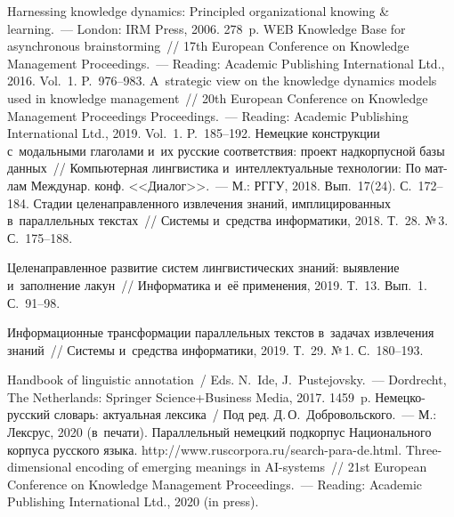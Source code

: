 {\begin{multicols}{2}
{{\begin{thebibliography}{99}
 Harnessing knowledge dynamics: Principled organizational knowing \& 
learning.~--- London: IRM Press, 2006. 278~p.
 WEB Knowledge Base for 
asynchronous brainstorming~// 17th European Conference on Knowledge Management 
Proceedings.~--- Reading: Academic Publishing International Ltd., 2016. Vol.~1. P.~976--983.
 A~strategic view on the knowledge dynamics models used in knowledge 
management~// 20th European Conference on Knowledge Management Proceedings  
Proceedings.~--- Reading: Academic Publishing International Ltd., 2019. 
Vol.~1. P.~185--192.
 Немецкие конструкции с~модальными 
глаголами и~их русские соответствия: проект надкорпусной базы данных~//\linebreak
 Компьютерная 
лингвистика и~интеллектуальные технологии: По мат-лам Междунар. конф. <<Диалог>>.~--- 
М.: РГГУ, 2018. Вып.~17(24). С.~172--184.
 Стадии целенаправленного извлечения знаний, имплицированных 
в~параллельных текстах~// Системы и~средства информатики, 2018. Т.~28. №\,3.  
С.~175--188.

 Целенаправленное развитие систем лингвистических знаний: выявление 
и~заполнение лакун~// Информатика и~её применения, 2019. Т.~13. Вып.~1. С.~91--98.

 Информационные трансформации параллельных текстов 
в~задачах извлечения знаний~// Системы и~средства информатики, 2019. Т.~29. №\,1.  
С.~180--193. 

Handbook of linguistic annotation~/ Eds. N.~Ide, J.~Pustejovsky.~--- Dordrecht, The Netherlands: 
Springer Science\;+\;Business Media, 2017. 1459~p.
Немецко-русский словарь: актуальная лексика~/ Под ред. Д.\,О.~Добровольского.~--- М.: 
Лексрус, 2020 (в~печати).
Параллельный немецкий подкорпус Национального корпуса русского языка. {\sf 
http://www.ruscorpora.ru/\linebreak search-para-de.html}.
 Three-dimensional encoding of emerging meanings in AI-systems~// 21st 
European Conference on Knowledge Management Proceedings.~--- Reading: Academic 
Publishing International Ltd., 2020 (in press).
\end{thebibliography}

 }
 }


\end{multicols}}

